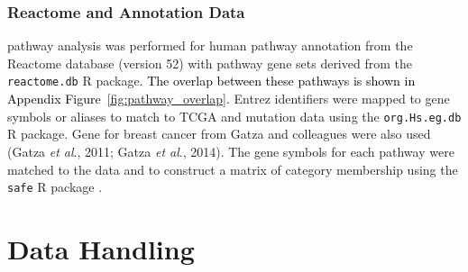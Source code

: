 

\subsubsection{Reactome and Annotation Data} \label{methods:gene_set}

\Gls{pathway} analysis was performed for human \gls{pathway} annotation from the Reactome database (version 52) with \gls{pathway} gene sets derived from the \texttt{reactome.db} R package. \textcolor{black}{The overlap between these pathways is shown in Appendix Figure~\ref{fig:pathway_overlap}.} Entrez identifiers were mapped to gene symbols or aliases to match to \gls{TCGA}  and \gls{mutation} data using the \texttt{org.Hs.eg.db} R package. Gene  for breast cancer from Gatza and colleagues were also used (Gatza \textit{et al}., 2011; Gatza \textit{et al}., 2014). The gene symbols for each pathway were matched to the  data and to construct a matrix of category membership using the \texttt{safe} R package \citep{safe}.

\section{Data Handling}


